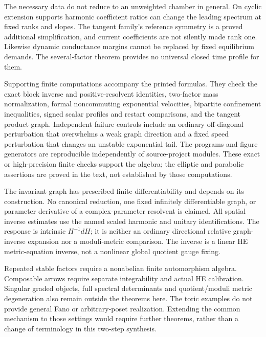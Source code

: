\documentclass[11pt]{amsart}
\theoremstyle{definition}
\theoremstyle{remark}
\begin{document}
The necessary data do not reduce to an unweighted chamber in
general. On cyclic extension supports harmonic coefficient ratios
can change the leading spectrum at fixed ranks and slopes. The
tangent family's reference symmetry is a proved additional
simplification, and current coefficients are not silently made
rank one. Likewise dynamic conductance margins cannot be replaced
by fixed equilibrium demands. The several-factor theorem provides
no universal closed time profile for them.

Supporting finite computations accompany the printed formulas. They
check the exact block inverse and positive-resolvent identities,
two-factor mass normalization, formal noncommuting exponential
velocities, bipartite confinement inequalities, signed scalar
profiles and restart comparisons, and the tangent product graph.
Independent failure controls include an ordinary off-diagonal
perturbation that overwhelms a weak graph direction and a fixed
speed perturbation that changes an unstable exponential tail.
The programs and figure generators are reproducible independently
of source-project modules. These exact or high-precision finite
checks support the algebra; the elliptic and parabolic assertions
are proved in the text, not established by those computations.

The invariant graph has prescribed finite differentiability and
depends on its construction. No canonical reduction, one fixed
infinitely differentiable graph, or parameter derivative of a
complex-parameter resolvent is claimed. All spatial inverse
estimates use the named scaled harmonic and unitary identifications.
The response is intrinsic \(H^{-1}dH\); it is neither an ordinary
directional relative graph-inverse expansion nor a moduli-metric
comparison. The inverse is a linear HE metric-equation inverse,
not a nonlinear global quotient gauge fixing.

Repeated stable factors require a nonabelian finite automorphism
algebra. Composable arrows require separate integrability and
actual HE calibration. Singular graded objects, full spectral
determinants and quotient/moduli metric degeneration also remain
outside the theorems here. The toric examples do not provide
general Fano or arbitrary-poset realization. Extending the common
mechanism to those settings would require further theorems, rather
than a change of terminology in this two-step synthesis.
\end{document}
